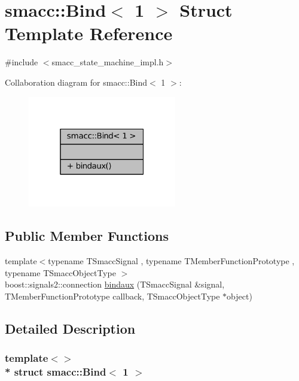 \hypertarget{structsmacc_1_1Bind_3_011_01_4}{}\section{smacc\+:\+:Bind$<$ 1 $>$ Struct Template Reference}
\label{structsmacc_1_1Bind_3_011_01_4}


{\ttfamily \#include $<$smacc\+\_\+state\+\_\+machine\+\_\+impl.\+h$>$}



Collaboration diagram for smacc\+:\+:Bind$<$ 1 $>$\+:
\nopagebreak
\begin{figure}[H]
\begin{center}
\leavevmode
\includegraphics[width=184pt]{structsmacc_1_1Bind_3_011_01_4__coll__graph}
\end{center}
\end{figure}
\subsection*{Public Member Functions}
\begin{DoxyCompactItemize}
\item 
{\footnotesize template$<$typename T\+Smacc\+Signal , typename T\+Member\+Function\+Prototype , typename T\+Smacc\+Object\+Type $>$ }\\boost\+::signals2\+::connection \hyperlink{structsmacc_1_1Bind_3_011_01_4_ab1ef45ad9d56f707284a5fcb166646ee}{bindaux} (T\+Smacc\+Signal \&signal, T\+Member\+Function\+Prototype callback, T\+Smacc\+Object\+Type $\ast$object)
\end{DoxyCompactItemize}


\subsection{Detailed Description}
\subsubsection*{template$<$$>$\\*
struct smacc\+::\+Bind$<$ 1 $>$}




